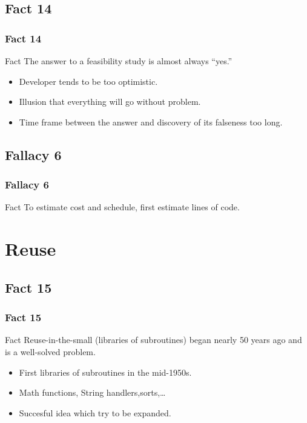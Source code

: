\documentclass{beamer}
\begin{document}
\subsection{Fact 14}
\begin{frame}
    \frametitle{Fact 14}
    \begin{block}{Fact}
    The answer to a feasibility study is almost always \enquote{yes.}
    \end{block}
    \begin{itemize}
    		\item Developer tends to be too optimistic.
    		\item Illusion that everything will go without problem.
    		\item Time frame between the answer and discovery of its falseness too long.
    \end{itemize}
\end{frame}

\subsection{Fallacy 6}
\begin{frame}
    \frametitle{Fallacy 6}
    \begin{block}{Fact}
    To estimate cost and schedule, first estimate lines of code.
    \end{block}
\end{frame}

\section{Reuse}

\subsection{Fact 15}
\begin{frame}
    \frametitle{Fact 15}
    \begin{block}{Fact}
    Reuse-in-the-small (libraries of subroutines) began nearly 50 years ago and
    is a well-solved problem.
    \end{block}
    \begin{itemize}
    		\item First libraries of subroutines in the mid-1950s.
    		\item Math functions, String handlers,sorts,\ldots
    		\item Succesful idea which try to be expanded.
    \end{itemize}
\end{frame}
\end{document}
